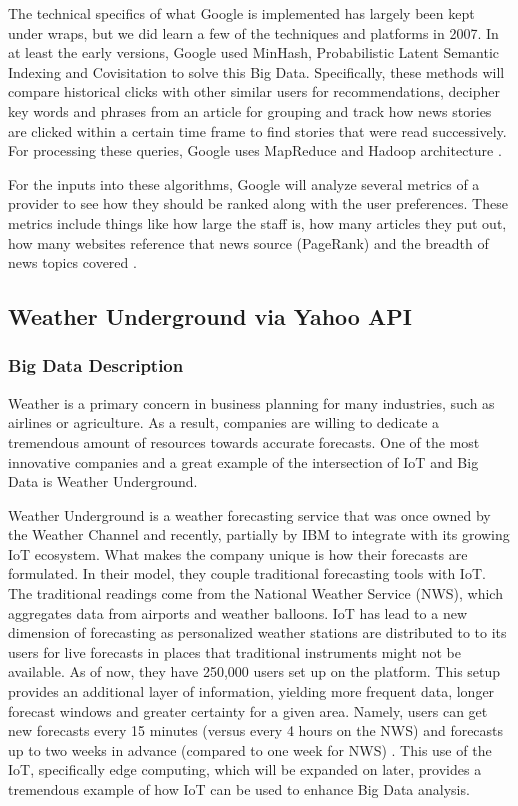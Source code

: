 \documentclass[sigconf]{acmart}
\begin{document}
The technical specifics of what Google is implemented has largely been kept under wraps, but we did learn a few of the techniques and platforms in 2007. In at least the early versions, Google used MinHash, Probabilistic Latent Semantic Indexing and Covisitation to solve this Big Data. Specifically, these methods will compare historical clicks with other similar users for recommendations, decipher key words and phrases from an article for grouping and track how news stories are clicked within a certain time frame to find stories that were read successively. For processing these queries, Google uses MapReduce and Hadoop architecture \cite{googlearch}.

For the inputs into these algorithms, Google will analyze several metrics of a provider to see how they should be ranked along with the user preferences. These metrics include things like how large the staff is, how many articles they put out, how many websites reference that news source (PageRank) and the breadth of news topics covered \cite{sauce}. 

\subsection{Weather Underground via Yahoo API}
\subsubsection{Big Data Description}
Weather is a primary concern in business planning for many industries, such as airlines or agriculture. As a result, companies are willing to dedicate a tremendous amount of resources towards accurate forecasts. One of the most innovative companies and a great example of the intersection of IoT and Big Data is Weather Underground. 

Weather Underground is a weather forecasting service that was once owned by the Weather Channel and recently, partially by IBM to integrate with its growing IoT ecosystem. What makes the company unique is how their forecasts are formulated. In their model,  they couple traditional forecasting tools with IoT. The traditional readings come from the National Weather Service (NWS), which aggregates data from airports and weather balloons. IoT has lead to a new dimension of forecasting as personalized weather stations are distributed to to its users for live forecasts in places that traditional instruments might not be available. As of now, they have 250,000 users set up on the platform. This setup provides an additional layer of information, yielding more frequent data, longer forecast windows and greater certainty for a given area. Namely, users can get new forecasts every 15 minutes (versus every 4 hours on the NWS) and forecasts up to two weeks in advance (compared to one week for NWS) \cite{wuabt}. This use of the IoT, specifically edge computing, which will be expanded on later, provides a tremendous example of how IoT can be used to enhance Big Data analysis. 
\end{document}

